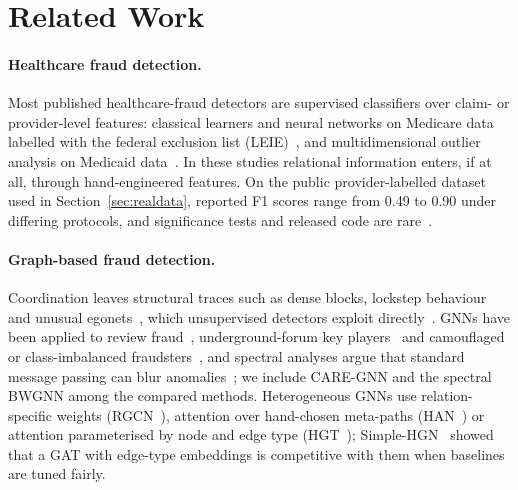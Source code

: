 \documentclass[pdflatex,sn-vancouver-num]{sn-jnl}
\begin{document}
\section{Related Work}\label{sec:related}

\paragraph{Healthcare fraud detection.}
Most published healthcare-fraud detectors are supervised classifiers over
claim- or provider-level features: classical learners and neural networks on
Medicare data labelled with the federal exclusion list
(LEIE)~\cite{bauder2017,herland2018,johnson2019}, and multidimensional outlier
analysis on Medicaid data~\cite{thornton2013}. In these studies relational
information enters, if at all, through hand-engineered features. On the public provider-labelled
dataset used in Section~\ref{sec:realdata}, reported F1 scores range from 0.49
to 0.90 under differing protocols, and significance tests and released code
are rare~\cite{curtis2025}.

\paragraph{Graph-based fraud detection.}
Coordination leaves structural traces such as dense blocks, lockstep
behaviour and unusual egonets~\cite{akoglu2015,pourhabibi2020}, which
unsupervised detectors exploit
directly~\cite{akoglu2010oddball,beutel2013copycatch,hooi2016fraudar}. GNNs
have been applied to review fraud~\cite{wang2019fdgars}, underground-forum
key players~\cite{zhang2019player2vec} and camouflaged or class-imbalanced
fraudsters~\cite{dou2020care,liu2021pcgnn}, and spectral analyses argue that
standard message passing can blur anomalies~\cite{tang2022bwgnn}; we include
CARE-GNN and the spectral BWGNN among the compared methods.
Heterogeneous GNNs use relation-specific weights
(RGCN~\cite{schlichtkrull2018}), attention over hand-chosen meta-paths
(HAN~\cite{wang2019han}) or attention parameterised by node and edge type
(HGT~\cite{hu2020hgt}); Simple-HGN~\cite{lv2021} showed that a GAT with
edge-type embeddings is competitive with them when baselines are tuned fairly.
\end{document}

